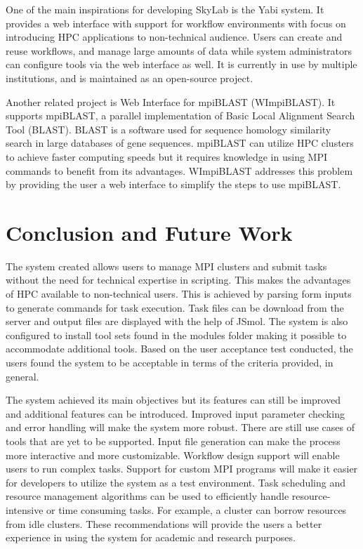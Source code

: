 One of the main inspirations for developing SkyLab is the Yabi system. It provides a web interface with support for workflow environments with focus on introducing HPC applications to non-technical audience. Users can create and reuse workflows, and manage large amounts of data while system administrators can configure tools via the web interface as well. It is currently in use by multiple institutions, and is maintained as an open-source project\cite{7411021620120101}.	    	    
	    
Another related project is Web Interface for mpiBLAST (WImpiBLAST). It supports mpiBLAST, a parallel implementation of Basic Local Alignment Search Tool (BLAST). BLAST is a software used for sequence homology similarity search in large databases of gene sequences. mpiBLAST can utilize HPC clusters to achieve faster computing speeds but it requires knowledge in using MPI commands to benefit from its advantages. WImpiBLAST addresses this problem by providing the user a web interface to simplify the steps to use mpiBLAST\cite{9686120720140601}.   
	
\section{Conclusion and Future Work}
The system created allows users to manage MPI clusters and submit tasks without the need for technical expertise in scripting. This makes the advantages of HPC available to non-technical users. This is achieved by parsing form inputs to generate commands for task execution. Task files can be download from the server and output files are displayed with the help of JSmol\cite{IJCH:IJCH201300024}. The system is also configured to install tool sets found in the modules folder making it possible to accommodate additional tools. Based on the user acceptance test conducted, the users found the system to be acceptable in terms of the criteria provided, in general. 

The system achieved its main objectives but its features can still be improved and additional features can be introduced. Improved input parameter checking and error handling will make the system more robust. There are still use cases of tools that are yet to be supported. Input file generation can make the process more interactive and more customizable.  Workflow design support will enable users to run complex tasks. Support for custom MPI programs will make it easier for developers to utilize the system as a test environment. Task scheduling and resource management algorithms can be used to efficiently handle resource-intensive or time consuming tasks. For example, a cluster can borrow resources from idle clusters. These recommendations will provide the users a better experience in using the system for academic and research purposes. 

